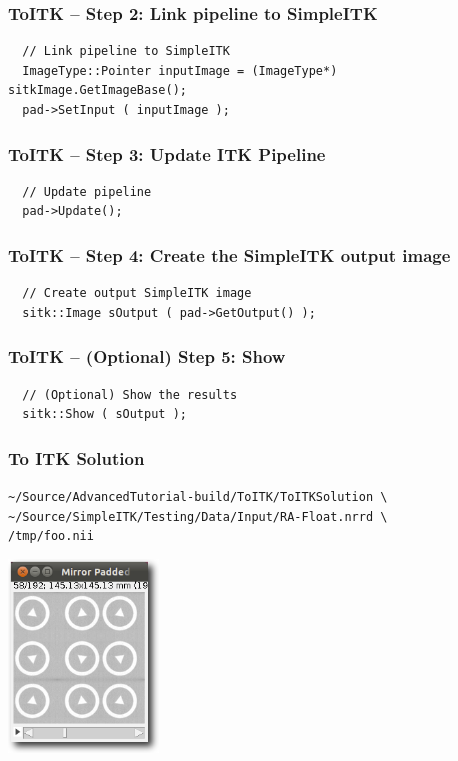 \begin{frame}[fragile]
\frametitle{ToITK -- Step 2: Link pipeline to SimpleITK}
\begin{lstlisting}
  // Link pipeline to SimpleITK
  ImageType::Pointer inputImage = (ImageType*) sitkImage.GetImageBase();
  pad->SetInput ( inputImage );
\end{lstlisting}
\end{frame}

\begin{frame}[fragile]
\frametitle{ToITK -- Step 3: Update ITK Pipeline}
\begin{lstlisting}
  // Update pipeline
  pad->Update();
\end{lstlisting}
\end{frame}

\begin{frame}[fragile]
\frametitle{ToITK -- Step 4: Create the SimpleITK output image}
\begin{lstlisting}
  // Create output SimpleITK image
  sitk::Image sOutput ( pad->GetOutput() );
\end{lstlisting}
\end{frame}

\begin{frame}[fragile]
\frametitle{ToITK -- (Optional) Step 5: Show}
\begin{lstlisting}
  // (Optional) Show the results
  sitk::Show ( sOutput );
\end{lstlisting}
\end{frame}

\begin{frame}[fragile]
\frametitle{To ITK Solution}
\texttt{\textasciitilde/Source/AdvancedTutorial-build/ToITK/ToITKSolution \textbackslash\\
  \textasciitilde/Source/SimpleITK/Testing/Data/Input/RA-Float.nrrd \textbackslash\\
  /tmp/foo.nii}
\begin{center}
  \includegraphics[width=0.3\textwidth]{Images/ToITKSolution_shadow}
\end{center}
\end{frame}


